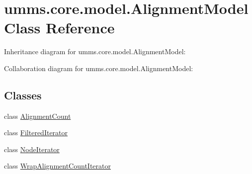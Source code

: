 \hypertarget{classumms_1_1core_1_1model_1_1_alignment_model}{\section{umms.\+core.\+model.\+Alignment\+Model Class Reference}
\label{classumms_1_1core_1_1model_1_1_alignment_model}
}


Inheritance diagram for umms.\+core.\+model.\+Alignment\+Model\+:


Collaboration diagram for umms.\+core.\+model.\+Alignment\+Model\+:
\subsection*{Classes}
\begin{DoxyCompactItemize}
\item 
class \hyperlink{classumms_1_1core_1_1model_1_1_alignment_model_1_1_alignment_count}{Alignment\+Count}
\item 
class \hyperlink{classumms_1_1core_1_1model_1_1_alignment_model_1_1_filtered_iterator}{Filtered\+Iterator}
\item 
class \hyperlink{classumms_1_1core_1_1model_1_1_alignment_model_1_1_node_iterator}{Node\+Iterator}
\item 
class \hyperlink{classumms_1_1core_1_1model_1_1_alignment_model_1_1_wrap_alignment_count_iterator}{Wrap\+Alignment\+Count\+Iterator}
\end{DoxyCompactItemize}
